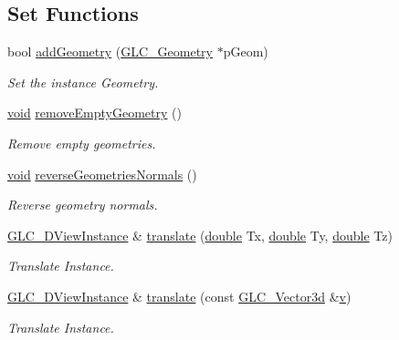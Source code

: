 \subsection*{Set Functions}
\begin{DoxyCompactItemize}
\item 
bool \hyperlink{class_g_l_c__3_d_view_instance_a4a6db9287ddbaf9ba7d9cf3ffd4387da}{add\-Geometry} (\hyperlink{class_g_l_c___geometry}{G\-L\-C\-\_\-\-Geometry} $\ast$p\-Geom)
\begin{DoxyCompactList}\small\item\em Set the instance Geometry. \end{DoxyCompactList}\item 
\hyperlink{group___u_a_v_objects_plugin_ga444cf2ff3f0ecbe028adce838d373f5c}{void} \hyperlink{class_g_l_c__3_d_view_instance_a7bc62a1321edcc187a228a5399c044c0}{remove\-Empty\-Geometry} ()
\begin{DoxyCompactList}\small\item\em Remove empty geometries. \end{DoxyCompactList}\item 
\hyperlink{group___u_a_v_objects_plugin_ga444cf2ff3f0ecbe028adce838d373f5c}{void} \hyperlink{class_g_l_c__3_d_view_instance_a792a06dfbe310031a2c620a84ba60217}{reverse\-Geometries\-Normals} ()
\begin{DoxyCompactList}\small\item\em Reverse geometry normals. \end{DoxyCompactList}\item 
\hyperlink{class_g_l_c__3_d_view_instance}{G\-L\-C\-\_\-D\-View\-Instance} \& \hyperlink{class_g_l_c__3_d_view_instance_a3b20ae9921f7dd74462dcaaa4575d6ee}{translate} (\hyperlink{_super_l_u_support_8h_a8956b2b9f49bf918deed98379d159ca7}{double} Tx, \hyperlink{_super_l_u_support_8h_a8956b2b9f49bf918deed98379d159ca7}{double} Ty, \hyperlink{_super_l_u_support_8h_a8956b2b9f49bf918deed98379d159ca7}{double} Tz)
\begin{DoxyCompactList}\small\item\em Translate Instance. \end{DoxyCompactList}\item 
\hyperlink{class_g_l_c__3_d_view_instance}{G\-L\-C\-\_\-D\-View\-Instance} \& \hyperlink{class_g_l_c__3_d_view_instance_a2dde160fe823a9ed52ae4e5edcda4f66}{translate} (const \hyperlink{class_g_l_c___vector3d}{G\-L\-C\-\_\-\-Vector3d} \&\hyperlink{glext_8h_a14cfbe2fc2234f5504618905b69d1e06}{v})
\begin{DoxyCompactList}\small\item\em Translate Instance. \end{DoxyCompactList}\item 

\end{DoxyCompactItemize}
